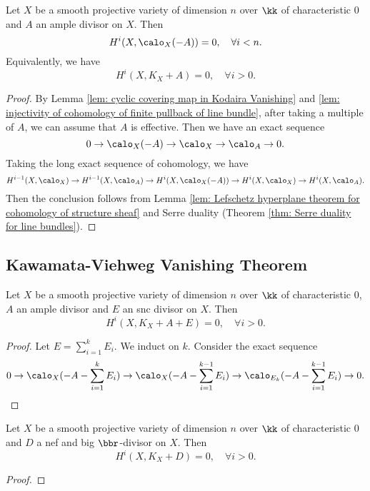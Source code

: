     \begin{theorem}\label{thm: Kodaira Vanishing Theorem}
        Let \(X\) be a smooth projective variety of dimension \(n\) over \(\kk\) of characteristic \(0\) and \(A\) an ample divisor on \(X\). 
        Then
        \[
            H^i(X, \calo_X(-A)) = 0,\quad \forall i < n.
        \]
        Equivalently, we have
        \[
            H^i(X, K_X + A) = 0,\quad \forall i > 0.
        \]
    \end{theorem}
    \begin{proof}
        By Lemma \ref{lem: cyclic covering map in Kodaira Vanishing} and \ref{lem: injectivity of cohomology of finite pullback of line bundle}, after taking a multiple of \(A\), we can assume that \(A\) is effective.
        Then we have an exact sequence
        \[ 0 \to \calo_X(-A) \to \calo_X \to \calo_A \to 0. \]
        Taking the long exact sequence of cohomology, we have
        \[ H^{i-1}(X,\calo_X) \to H^{i-1}(X, \calo_A) \to H^{i}(X, \calo_X(-A)) \to H^{i}(X, \calo_X) \to H^{i}(X, \calo_A). \]
        Then the conclusion follows from Lemma \ref{lem: Lefschetz hyperplane theorem for cohomology of structure sheaf} and Serre duality (Theorem \ref{thm: Serre duality for line bundles}).
    \end{proof}

\subsection{Kawamata-Viehweg Vanishing Theorem}

    \begin{lemma}\label{lem: vanishing for ample plus snc divisor}
        Let \(X\) be a smooth projective variety of dimension \(n\) over \(\kk\) of characteristic \(0\), \(A\) an ample divisor and \(E\) an snc divisor on \(X\).
        Then
        \[
            H^i(X, K_X + A + E) = 0,\quad \forall i > 0.
        \]
    \end{lemma}
    \begin{proof}
        Let \(E = \sum_{i=1}^k E_i\).
        We induct on \(k\).
        Consider the exact sequence
        \[ 0 \to \calo_X(-A-\sum_{i=1}^{k} E_i) \to \calo_X(-A-\sum_{i=1}^{k-1} E_i) \to \calo_{E_k}(-A-\sum_{i=1}^{k-1} E_i) \to 0. \]
    \end{proof}

    \begin{theorem}\label{thm: Kawamata-Viehweg Vanishing Theorem for nef and big divisor}
        Let \(X\) be a smooth projective variety of dimension \(n\) over \(\kk\) of characteristic \(0\) and \(D\) a nef and big \(\bbr\)-divisor on \(X\).
        Then 
        \[ H^i(X, K_X + D) = 0,\quad \forall i > 0. \]
    \end{theorem}
    \begin{proof}
    \end{proof}

